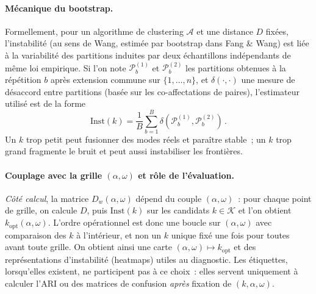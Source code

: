 \documentclass[11pt,a4paper]{article}
\newcommand{\Dw}{D_w}
\begin{document}
\paragraph{Mécanique du bootstrap.}
Formellement, pour un algorithme de clustering $\mathcal{A}$ et une distance
$D$ fixées, l'instabilité (au sens de Wang, estimée par bootstrap dans Fang \&
Wang) est liée à la variabilité des partitions induites par deux échantillons
indépendants de même loi empirique. Si l'on note $\mathcal{P}^{(1)}_b$ et
$\mathcal{P}^{(2)}_b$ les partitions obtenues à la répétition $b$ après extension
commune sur $\{1,\ldots,n\}$, et $\delta(\cdot,\cdot)$ une mesure de désaccord
entre partitions (basée sur les co-affectations de paires), l'estimateur
utilisé est de la forme
\begin{equation}
  \mathrm{Inst}(k)
  = \frac{1}{B}\sum_{b=1}^B \delta\!\left(\mathcal{P}^{(1)}_b,\mathcal{P}^{(2)}_b\right)\,.
\end{equation}
Un $k$ trop petit peut fusionner des modes réels et paraître stable~; un $k$ trop
grand fragmente le bruit et peut aussi instabiliser les frontières.

\paragraph{Couplage avec la grille \texorpdfstring{$(\alpha,\omega)$}{(alpha, omega)} et rôle de l'évaluation.}
\emph{Côté calcul}, la matrice $\Dw(\alpha,\omega)$ dépend du couple
$(\alpha,\omega)$~: pour chaque point de grille, on calcule $D$, puis
$\mathrm{Inst}(k)$ sur les candidats $k\in\mathcal{K}$ et l'on obtient
$k_{\mathrm{opt}}(\alpha,\omega)$. L'ordre opérationnel est donc une boucle sur
$(\alpha,\omega)$ avec comparaison des $k$ à l'intérieur, et non un $k$ unique
fixé une fois pour toutes avant toute grille. On obtient ainsi une carte
$(\alpha,\omega)\mapsto k_{\mathrm{opt}}$ et des représentations
d'instabilité (heatmaps) utiles au diagnostic. Les étiquettes, lorsqu'elles
existent, ne participent pas à ce choix~: elles servent uniquement à calculer
l'ARI ou des matrices de confusion \emph{après} fixation de
$(k,\alpha,\omega)$.
\end{document}
